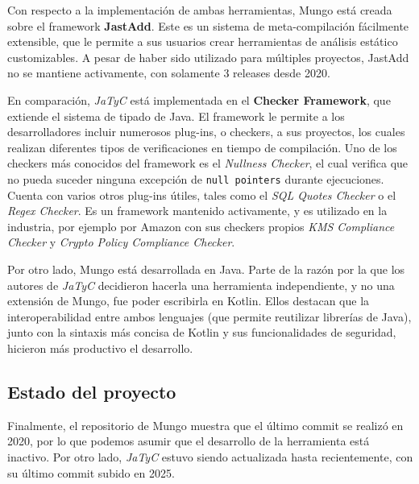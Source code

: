 Con respecto a la implementación de ambas herramientas, Mungo está creada sobre el framework \textbf{JastAdd}\cite{jastadd:website}. Este es un sistema de meta-compilación fácilmente extensible, que le permite a sus usuarios crear herramientas de análisis estático customizables. A pesar de haber sido utilizado para múltiples proyectos\cite{jastadd:applications}, JastAdd no se mantiene activamente, con solamente 3 releases desde 2020.

En comparación, \textit{JaTyC} está implementada en el \textbf{Checker Framework}\cite{checker-framework}, que extiende el sistema de tipado de Java. El framework le permite a los desarrolladores incluir numerosos plug-ins, o checkers, a sus proyectos, los cuales realizan diferentes tipos de verificaciones en tiempo de compilación. Uno de los checkers más conocidos del framework es el \textit{Nullness Checker}, el cual verifica que no pueda suceder ninguna excepción de \texttt{null pointers} durante ejecuciones. Cuenta con varios otros plug-ins útiles, tales como el \textit{SQL Quotes Checker} o el \textit{Regex Checker}. Es un framework mantenido activamente, y es utilizado en la industria, por ejemplo por Amazon con sus checkers propios \textit{KMS Compliance Checker}\cite{aws:kms-compliance-checker} y \textit{Crypto Policy Compliance Checker}\cite{aws:crypto-policy-compliance-checker}.

Por otro lado, Mungo está desarrollada en Java. Parte de la razón por la que los autores de \textit{JaTyC} decidieron hacerla una herramienta independiente, y no una extensión de Mungo, fue poder escribirla en Kotlin\cite{Kotlin}. Ellos destacan que la interoperabilidad entre ambos lenguajes (que permite reutilizar librerías de Java), junto con la sintaxis más concisa de Kotlin y sus funcionalidades de seguridad, hicieron más productivo el desarrollo.

\subsection{Estado del proyecto}

Finalmente, el repositorio de Mungo\cite{mungo:repo} muestra que el último commit se realizó en 2020, por lo que podemos asumir que el desarrollo de la herramienta está inactivo. Por otro lado, \textit{JaTyC} estuvo siendo actualizada hasta recientemente, con su último commit subido en 2025.
